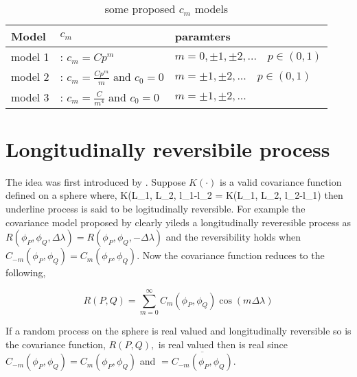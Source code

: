 		
		\begin{table}[H]
			\centering
			\begin{tabular}{l|l|l}
				\hline
				Model   & $c_m$                                            & paramters                                \\ 
				\hline \hline
				model 1 & : $c_m = Cp^m$                                & $m=0, \pm 1, \pm 2,... \quad p\in (0,1)$ \\
				model 2 & : $c_m = \frac{Cp^m}{m} \mbox{ and } c_0 = 0$ & $m=\pm 1, \pm 2,... \quad p\in (0,1)$    \\
				model 3 & : $c_m = \frac{C}{m^4} \mbox{ and } c_0 = 0$  & $m=\pm 1, \pm 2,...$                     \\
				\hline
			\end{tabular}
			\caption{some proposed $c_m$ models}
		\end{table}
			
		\section{Longitudinally reversibile process}
			
		The idea was first introduced by \cite{Stein2007}. Suppose $K(\cdot)$ is a valid covariance function defined on a sphere where,
		\beq
		K(L_1, L_2, l_1-l_2 = K(L_1, L_2, l_2-l_1)
		\eeq
then underline process is said to be logitudinally reversible. For example the covariance model proposed by \cite{Huang2012} clearly yileds a longitudinally reveresible process as $R(\phi_P, \phi_Q, \Delta\lambda) = R(\phi_P, \phi_Q, -\Delta\lambda)$ and the reversibility holds when $C_{-m}(\phi_P,\phi_Q)=C_m(\phi_P,\phi_Q)$. Now the covariance function reduces to the following,  

\[
R(P,Q) = \sum_{m=0}^{\infty} C_m(\phi_P,\phi_Q)\cos(m\Delta\lambda)
\]

If a random process on the sphere is real valued and longitudinally reversible so is the covariance function, $R(P,Q),$ is real valued then \Cm is real since $C_{-m}(\phi_P,\phi_Q)=C_m(\phi_P,\phi_Q)$  and \Cm $= \overline{C_{-m}(\phi_P,\phi_Q)}$.

			
			
			
			
